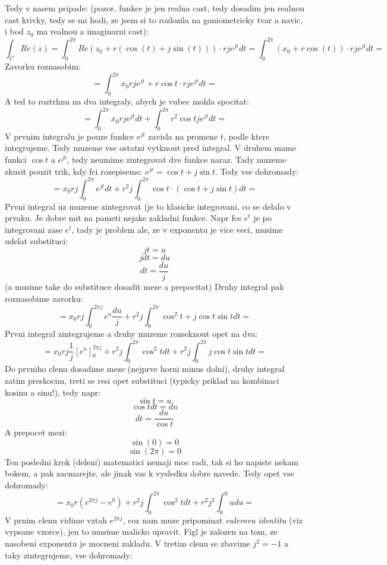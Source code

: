 Tedy v nasem pripade: (pozor, funkce je jen realna cast, tedy dosadim jen realnou cast krivky, tedy se mi hodi, ze jsem si to rozlozila na goniometricky tvar a navic, i bod $z_0$ ma realnou a imaginarni cast):
$$\int_C Re(z) = \int_0^{2\pi} Re(z_0+r(\operatorname{cos}(t)+j\operatorname{sin}(t)))\cdot rje^{jt} dt = \int_0^{2\pi} (x_0+r\operatorname{cos}(t)) \cdot rje^{jt} dt =$$
Zavorku roznasobim:
$$=\int_0^{2\pi} x_0rje^{jt} + r\operatorname{cos}t\cdot rje^{jt} dt=$$
A ted to roztrhnu na dva integraly, abych je vubec mohla spocitat:
$$=\int_0^{2\pi}x_0rje^{jt} dt + \int_0^{2\pi} r^2\operatorname{cos}tje^{jt} dt= $$
V prvnim integralu je pouze funkce $e^{jt}$ zavisla na promene $t$, podle ktere integrujeme. Tedy muzeme vse ostatni vytknout pred integral. V druhem mame funkci $\operatorname{cos}t$ a $e^{jt}$, tedy neumime zintegrovat dve funkce naraz. Tady muzeme zkusit pouzit trik, kdy fci rozepiseme: $e^{jt} = \operatorname{cos}t + j\operatorname{sin}t$. Tedy vse dohromady:
$$=x_0 rj\int_0^{2\pi}e^{jt} dt + r^2 j\int_0^{2\pi} \operatorname{cos}t\cdot (\operatorname{cos}t + j\operatorname{sin}t)dt = $$
Prvni integral uz muzeme zintegrovat (je to klasicke integrovani, co se delalo v prvaku. Je dobre mit na pameti nejake zakladni funkce. Napr fce $e^t$ je po integrovani zase $e^t$, tady je problem ale, ze v exponentu je vice veci, musime udelat substituci:
$$jt = u$$
$$jdt = du$$
$$dt = \frac{du}{j}$$
(a musime take do substituce dosadit meze a prepocitat)
Druhy integral pak roznasobime zavorku:
$$ = x_0rj \int_0^{2\pi j} e^u \frac{du}{j}+ r^2 j\int_0^{2\pi} \operatorname{cos}^2t + j\operatorname{cos}t\operatorname{sin}tdt = $$
Prvni integral zintegrujeme a druhy muzeme rozseknout opet na dva:
$$= x_0rj \frac{1}{j} \left[ e^u\right]_0^{2\pi j} + r^2 j\int_0^{2\pi} \operatorname{cos}^2t dt + r^2 j\int_0^{2\pi} j\operatorname{cos}t \operatorname{sin}tdt = $$
Do prvniho clenu dosadime meze (nejprve horni minus dolni), druhy integral zatim preskocim, treti se resi opet substituci (typicky priklad na kombinaci kosinu a sinu!), tedy napr:
$$\operatorname{sin}t = u$$
$$\operatorname{cos}t dt = du$$
$$dt = \frac{du}{\operatorname{cos}t}$$
A prepocet mezi:
$$\operatorname{sin}(0) = 0$$
$$\operatorname{sin}(2\pi) = 0$$
Ten posledni krok (deleni) matematici nemaji moc radi, tak si ho napiste nekam bokem, a pak zacmarejte, ale jinak vas k vysledku dobre navede. Tedy opet vse dohromady:
$$ = x_0 r (e^{2\pi j} - e^0) + r^2 j\int_0^{2\pi} \operatorname{cos}^2t dt + r^2 j^2\int_0^{0} u du = $$
V prnim clenu vidime vztah $e^{2\pi j}$, coz nam muze pripominat \textit{eulerovu identitu} (viz vypsane vzorce), jen to musime malicko upravit. Figl je zalozen na tom, ze nasobeni exponentu je mocneni zakladu. V tretim clenu se zbavime $j^2 = -1$ a taky zintegrujeme, vse dohromady:

